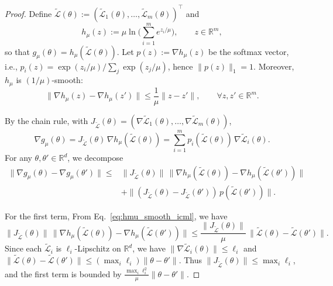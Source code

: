 \documentclass[sigconf]{acmart}
\begin{document}
\begin{proof}
Define $\boldsymbol{\tilde{\mathcal{L}}}(\theta):=(\tilde{\mathcal{L}}_1(\theta),\ldots,\tilde{\mathcal{L}}_m(\theta))^\top$ and
\[
h_\mu(z):=\mu\ln\Big(\sum_{i=1}^m e^{z_i/\mu}\Big),\qquad z\in\mathbb{R}^m,
\]
so that $g_\mu(\theta)=h_\mu(\boldsymbol{\tilde{\mathcal{L}}}(\theta))$. Let $p(z):=\nabla h_\mu(z)$ be the softmax vector, i.e.,
$p_i(z)=\exp(z_i/\mu)/\sum_{j}\exp(z_j/\mu)$, hence $\|p(z)\|_1=1$.
Moreover, $h_\mu$ is $(1/\mu)$-smooth:
\begin{equation}\label{eq:hmu_smooth_icml}
\|\nabla h_\mu(z)-\nabla h_\mu(z')\|\le \frac{1}{\mu}\|z-z'\|,\qquad \forall z,z'\in\mathbb{R}^m .
\end{equation}

By the chain rule, with $J_{\boldsymbol{\tilde{\mathcal{L}}}}(\theta)=(\nabla \tilde{\mathcal{L}}_1(\theta),\ldots,\nabla \tilde{\mathcal{L}}_m(\theta))$,
\[
\nabla g_\mu(\theta)=J_{\boldsymbol{\tilde{\mathcal{L}}}}(\theta)\,\nabla h_\mu(\boldsymbol{\tilde{\mathcal{L}}}(\theta))
=\sum_{i=1}^m p_i(\boldsymbol{\tilde{\mathcal{L}}}(\theta))\,\nabla \tilde{\mathcal{L}}_i(\theta).
\]
For any $\theta,\theta'\in \mathbb{R}^d$, we decompose
\begin{align*}
\|\nabla g_\mu(\theta)-\nabla g_\mu(\theta')\|
\le& \|J_{\boldsymbol{\tilde{\mathcal{L}}}}(\theta)\|\,\|\nabla h_\mu(\boldsymbol{\tilde{\mathcal{L}}}(\theta))-\nabla h_\mu(\boldsymbol{\tilde{\mathcal{L}}}(\theta'))\| \\ 
&+ \|(J_{\boldsymbol{\tilde{\mathcal{L}}}}(\theta)-J_{\boldsymbol{\tilde{\mathcal{L}}}}(\theta'))\,p(\boldsymbol{\tilde{\mathcal{L}}}(\theta'))\|.
\end{align*}

For the first term, From Eq.~\eqref{eq:hmu_smooth_icml}, we have
\[
\|J_{\boldsymbol{\tilde{\mathcal{L}}}}(\theta)\|\,\|\nabla h_\mu(\boldsymbol{\tilde{\mathcal{L}}}(\theta))-\nabla h_\mu(\boldsymbol{\tilde{\mathcal{L}}}(\theta'))\|
\le \frac{\|J_{\boldsymbol{\tilde{\mathcal{L}}}}(\theta)\|}{\mu}\,\|\boldsymbol{\tilde{\mathcal{L}}}(\theta)-\boldsymbol{\tilde{\mathcal{L}}}(\theta')\|.
\]
Since each $\tilde{\mathcal{L}}_i$ is $\ell_i$-Lipschitz on $\mathbb{R}^d$, we have
$\|\nabla \tilde{\mathcal{L}}_i(\theta)\|\le \ell_i$ and $\|\boldsymbol{\tilde{\mathcal{L}}}(\theta)-\boldsymbol{\tilde{\mathcal{L}}}(\theta')\|\le (\max_i \ell_i)\|\theta-\theta'\|$.
Thus $\|J_{\boldsymbol{\tilde{\mathcal{L}}}}(\theta)\|\le \max_i \ell_i$, and the first term is bounded by
$\frac{\max_i \ell_i^2}{\mu}\|\theta-\theta'\|$.


\end{proof}
\end{document}
